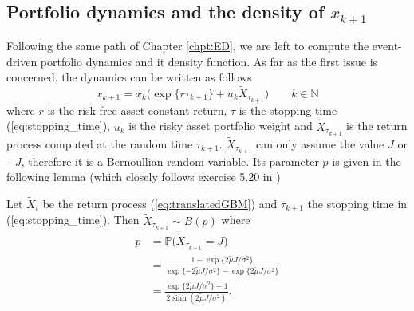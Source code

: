 \subsection{Portfolio dynamics and the density of $x_{k+1}$}
Following the same path of Chapter \ref{chpt:ED}, we are left to compute the event-driven portfolio dynamics and it density function. As far as the first issue is concerned, the dynamics can be written as follows
\begin{equation}\label{eq:GBM_portfolio_dynamics}
\boxed{x_{k+1}=x_k\big(\exp\{r\tau_{k+1}\} + u_k\widetilde{X}_{\tau_{k+1}}\big)} \qquad k \in \mathbb{N}
\end{equation}
where $r$ is the risk-free asset constant return, $\tau$ is the stopping time (\ref{eq:stopping_time}), $u_k$ is the risky asset portfolio weight and $\widetilde{X}_{\tau_{k+1}}$ is the return process computed at the random time $\tau_{k+1}$. $\widetilde{X}_{\tau_{k+1}}$ can only assume the value $J$ or $-J$, therefore it is a Bernoullian random variable. Its parameter $p$ is given in the following lemma (which closely follows exercise 5.20 in \cite{baldi2017})
\begin{lemma}\label{lemma:probability_positive_jump}
	Let $\widetilde{X}_t$ be the return process (\ref{eq:translatedGBM}) and $\tau_{k+1}$ the stopping time in (\ref{eq:stopping_time}). Then $\widetilde{X}_{\tau_{k+1}} \sim B(p)$ where 
	\begin{align}
	p &= \mathbb{P}\Big(\widetilde{X}_{\tau_{k+1}}=J\Big)\\[2ex]\nonumber
	&=\frac{1-\exp\{2\widetilde{\mu}J/\sigma^2\}}{\exp\{-2\widetilde{\mu}J/\sigma^2\} - \exp\{2\widetilde{\mu}J/\sigma^2\}} \\[2ex]\nonumber
	& = \frac{\exp\{2\widetilde{\mu}J/\sigma^2\}-1}{2\sinh(2\widetilde{\mu}J/\sigma^2)}.
	\end{align}
\end{lemma}
